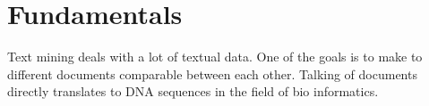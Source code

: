 \section{Fundamentals}

Text mining deals with a lot of textual data. One of the goals is to make to different documents comparable between each other. Talking of documents directly translates to DNA sequences in the field of bio informatics.\\




